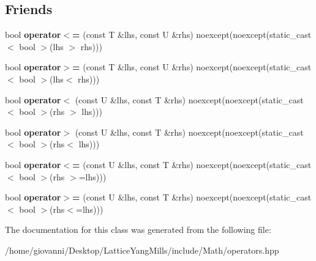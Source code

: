 \subsection*{Friends}
\begin{DoxyCompactItemize}
\item 
bool {\bfseries operator$<$=} (const T \&lhs, const U \&rhs) noexcept(noexcept(static\+\_\+cast$<$ bool $>$(lhs $>$ rhs)))\hypertarget{classtao_1_1operators_1_1less__than__comparable_a5bf5dd2e2ebcfbbeb10bdf82af562edd}{}\label{classtao_1_1operators_1_1less__than__comparable_a5bf5dd2e2ebcfbbeb10bdf82af562edd}

\item 
bool {\bfseries operator$>$=} (const T \&lhs, const U \&rhs) noexcept(noexcept(static\+\_\+cast$<$ bool $>$(lhs$<$ rhs)))\hypertarget{classtao_1_1operators_1_1less__than__comparable_a0c3b1b5114d1ee0acc05ff0d22a7df9a}{}\label{classtao_1_1operators_1_1less__than__comparable_a0c3b1b5114d1ee0acc05ff0d22a7df9a}

\item 
bool {\bfseries operator$<$} (const U \&lhs, const T \&rhs) noexcept(noexcept(static\+\_\+cast$<$ bool $>$(rhs $>$ lhs)))\hypertarget{classtao_1_1operators_1_1less__than__comparable_aa864eedf6200b61eb960901241ffa350}{}\label{classtao_1_1operators_1_1less__than__comparable_aa864eedf6200b61eb960901241ffa350}

\item 
bool {\bfseries operator$>$} (const U \&lhs, const T \&rhs) noexcept(noexcept(static\+\_\+cast$<$ bool $>$(rhs$<$ lhs)))\hypertarget{classtao_1_1operators_1_1less__than__comparable_a240258602e3bc12acace0cf18ebc6792}{}\label{classtao_1_1operators_1_1less__than__comparable_a240258602e3bc12acace0cf18ebc6792}

\item 
bool {\bfseries operator$<$=} (const U \&lhs, const T \&rhs) noexcept(noexcept(static\+\_\+cast$<$ bool $>$(rhs $>$=lhs)))\hypertarget{classtao_1_1operators_1_1less__than__comparable_ad9e95f30ae99649b5f5f6c1d96018328}{}\label{classtao_1_1operators_1_1less__than__comparable_ad9e95f30ae99649b5f5f6c1d96018328}

\item 
bool {\bfseries operator$>$=} (const U \&lhs, const T \&rhs) noexcept(noexcept(static\+\_\+cast$<$ bool $>$(rhs$<$=lhs)))\hypertarget{classtao_1_1operators_1_1less__than__comparable_aa8c6aaf5db19ceb0d85f9af3081e73d9}{}\label{classtao_1_1operators_1_1less__than__comparable_aa8c6aaf5db19ceb0d85f9af3081e73d9}

\end{DoxyCompactItemize}


The documentation for this class was generated from the following file\+:\begin{DoxyCompactItemize}
\item 
/home/giovanni/\+Desktop/\+Lattice\+Yang\+Mills/include/\+Math/operators.\+hpp\end{DoxyCompactItemize}
